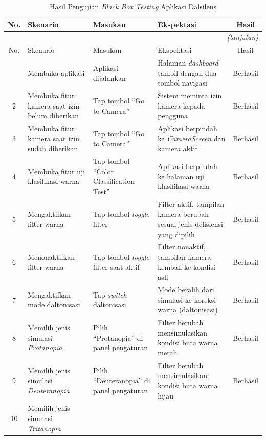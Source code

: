 \begin{longtable}{|c|>{\raggedright\arraybackslash}p{3.5cm}|>{\raggedright\arraybackslash}p{2.8cm}|>{\raggedright\arraybackslash}p{3.5cm}|c|}
  \caption{Hasil Pengujian \textit{Black Box Testing} Aplikasi Dalsilens}
  \label{tab:blackbox} \\
  \hline
  No. & Skenario & Masukan & Ekspektasi & Hasil \\
  \hline
  \endfirsthead
  \multicolumn{5}{r}{\textit{(lanjutan)}} \\
  \hline
  No. & Skenario & Masukan & Ekspektasi & Hasil \\
  \hline
  \endhead
  \hline
  \endfoot
  1 &
  Membuka aplikasi &
  Aplikasi dijalankan &
  Halaman \textit{dashboard} tampil dengan dua tombol navigasi &
  Berhasil \\
  \hline
  2 &
  Membuka fitur kamera saat izin belum diberikan &
  Tap tombol ``Go to Camera'' &
  Sistem meminta izin kamera kepada pengguna &
  Berhasil \\
  \hline
  3 &
  Membuka fitur kamera saat izin sudah diberikan &
  Tap tombol ``Go to Camera'' &
  Aplikasi berpindah ke \textit{CameraScreen} dan kamera aktif &
  Berhasil \\
  \hline
  4 &
  Membuka fitur uji klasifikasi warna &
  Tap tombol ``Color Classification Test'' &
  Aplikasi berpindah ke halaman uji klasifikasi warna &
  Berhasil \\
  \hline
  5 &
  Mengaktifkan filter warna &
  Tap tombol \textit{toggle} filter &
  Filter aktif, tampilan kamera berubah sesuai jenis defisiensi yang dipilih &
  Berhasil \\
  \hline
  6 &
  Menonaktifkan filter warna &
  Tap tombol \textit{toggle} filter saat aktif &
  Filter nonaktif, tampilan kamera kembali ke kondisi asli &
  Berhasil \\
  \hline
  7 &
  Mengaktifkan mode daltonisasi &
  Tap \textit{switch} daltonisasi &
  Mode beralih dari simulasi ke koreksi warna (daltonisasi) &
  Berhasil \\
  \hline
  8 &
  Memilih jenis simulasi \textit{Protanopia} &
  Pilih ``Protanopia'' di panel pengaturan &
  Filter berubah mensimulasikan kondisi buta warna merah &
  Berhasil \\
  \hline
  9 &
  Memilih jenis simulasi \textit{Deuteranopia} &
  Pilih ``Deuteranopia'' di panel pengaturan &
  Filter berubah mensimulasikan kondisi buta warna hijau &
  Berhasil \\
  \hline
  10 &
  Memilih jenis simulasi \textit{Tritanopia} &

\end{longtable}
